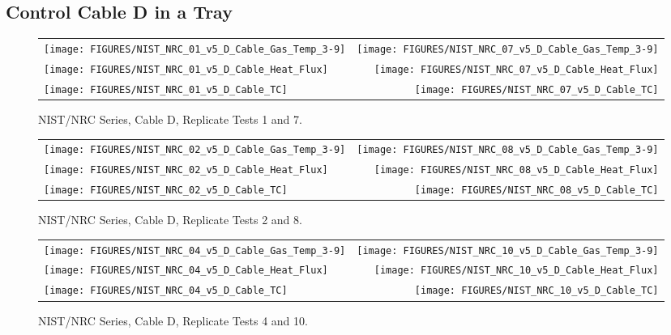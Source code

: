 \subsection{Control Cable D in a Tray}

\vspace{1in}

\begin{figure}[h!]
\begin{tabular*}{\textwidth}{l@{\extracolsep{\fill}}r}
\texttt{[image: FIGURES/NIST\_NRC\_01\_v5\_D\_Cable\_Gas\_Temp\_3-9]} &
\texttt{[image: FIGURES/NIST\_NRC\_07\_v5\_D\_Cable\_Gas\_Temp\_3-9]} \\
\texttt{[image: FIGURES/NIST\_NRC\_01\_v5\_D\_Cable\_Heat\_Flux]} &
\texttt{[image: FIGURES/NIST\_NRC\_07\_v5\_D\_Cable\_Heat\_Flux]} \\
\texttt{[image: FIGURES/NIST\_NRC\_01\_v5\_D\_Cable\_TC]} &
\texttt{[image: FIGURES/NIST\_NRC\_07\_v5\_D\_Cable\_TC]}
\end{tabular*}
\caption{NIST/NRC Series, Cable D, Replicate Tests 1 and 7.}
\label{NIST_NRC_D_1_and_7}
\end{figure}

\begin{figure}[h]
\begin{tabular*}{\textwidth}{l@{\extracolsep{\fill}}r}
\texttt{[image: FIGURES/NIST\_NRC\_02\_v5\_D\_Cable\_Gas\_Temp\_3-9]} &
\texttt{[image: FIGURES/NIST\_NRC\_08\_v5\_D\_Cable\_Gas\_Temp\_3-9]} \\
\texttt{[image: FIGURES/NIST\_NRC\_02\_v5\_D\_Cable\_Heat\_Flux]} &
\texttt{[image: FIGURES/NIST\_NRC\_08\_v5\_D\_Cable\_Heat\_Flux]} \\
\texttt{[image: FIGURES/NIST\_NRC\_02\_v5\_D\_Cable\_TC]} &
\texttt{[image: FIGURES/NIST\_NRC\_08\_v5\_D\_Cable\_TC]}
\end{tabular*}
\caption{NIST/NRC Series, Cable D, Replicate Tests 2 and 8.}
\label{NIST_NRC_D_2_and_8}
\end{figure}

\begin{figure}[h]
\begin{tabular*}{\textwidth}{l@{\extracolsep{\fill}}r}
\texttt{[image: FIGURES/NIST\_NRC\_04\_v5\_D\_Cable\_Gas\_Temp\_3-9]} &
\texttt{[image: FIGURES/NIST\_NRC\_10\_v5\_D\_Cable\_Gas\_Temp\_3-9]} \\
\texttt{[image: FIGURES/NIST\_NRC\_04\_v5\_D\_Cable\_Heat\_Flux]} &
\texttt{[image: FIGURES/NIST\_NRC\_10\_v5\_D\_Cable\_Heat\_Flux]} \\
\texttt{[image: FIGURES/NIST\_NRC\_04\_v5\_D\_Cable\_TC]} &
\texttt{[image: FIGURES/NIST\_NRC\_10\_v5\_D\_Cable\_TC]}
\end{tabular*}
\caption{NIST/NRC Series, Cable D, Replicate Tests 4 and 10.}
\label{NIST_NRC_D_4_and_10}
\end{figure}

